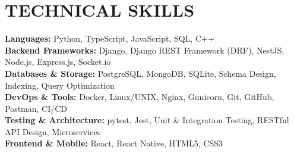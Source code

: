 \section*{TECHNICAL SKILLS}
\small
\textbf{Languages:} Python, TypeScript, JavaScript, SQL, C++\\
\textbf{Backend Frameworks:} Django, Django REST Framework (DRF), NestJS, Node.js, Express.js, Socket.io\\
\textbf{Databases \& Storage:} PostgreSQL, MongoDB, SQLite, Schema Design, Indexing, Query Optimization\\
\textbf{DevOps \& Tools:} Docker, Linux/UNIX, Nginx, Gunicorn, Git, GitHub, Postman, CI/CD\\
\textbf{Testing \& Architecture:} pytest, Jest, Unit \& Integration Testing, RESTful API Design, Microservices\\
\textbf{Frontend \& Mobile:} React, React Native, HTML5, CSS3
